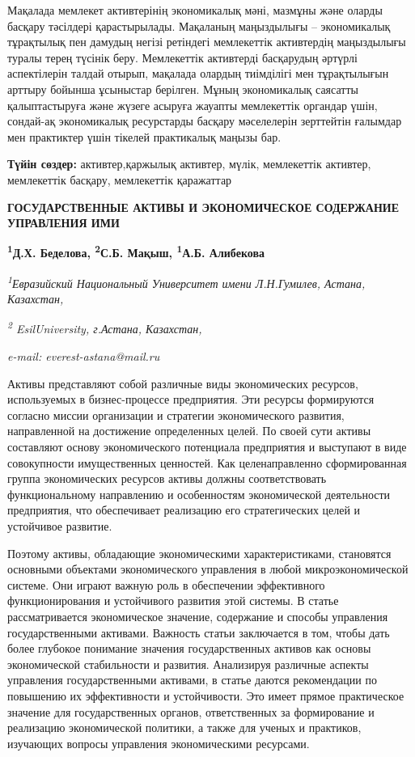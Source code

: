 Мақалада мемлекет активтерінің экономикалық мәні, мазмұны және оларды
басқару тәсілдері қарастырылады. Мақаланың маңыздылығы -- экономикалық
тұрақтылық пен дамудың негізі ретіндегі мемлекеттік активтердің
маңыздылығы туралы терең түсінік беру. Мемлекеттік активтерді басқарудың
әртүрлі аспектілерін талдай отырып, мақалада олардың тиімділігі мен
тұрақтылығын арттыру бойынша ұсыныстар берілген. Мұның экономикалық
саясатты қалыптастыруға және жүзеге асыруға жауапты мемлекеттік органдар
үшін, сондай-ақ экономикалық ресурстарды басқару мәселелерін зерттейтін
ғалымдар мен практиктер үшін тікелей практикалық маңызы бар.

{\bfseries Түйін сөздер:} активтер,қаржылық активтер, мүлік, мемлекеттік
активтер, мемлекеттік басқару, мемлекеттік қаражаттар

\begin{articleheader}
{\bfseries ГОСУДАРСТВЕННЫЕ АКТИВЫ И ЭКОНОМИЧЕСКОЕ СОДЕРЖАНИЕ УПРАВЛЕНИЯ ИМИ}

{\bfseries
\textsuperscript{1}Д.Х. Беделова\textsuperscript{\envelope },
\textsuperscript{2}С.Б. Мақыш,
\textsuperscript{1}А.Б. Алибекова}
\end{articleheader}

\begin{affiliation}
{\em \textsuperscript{1}Евразийский Национальный Университет имени Л.Н.Гумилев, Астана, Казахстан,}

{\em \textsuperscript{2} EsilUniversity, г.Астана, Казахстан,}

\emph{e-mail: everest-astana@mail.ru}
\end{affiliation}

Активы представляют собой различные виды экономических ресурсов,
используемых в бизнес-процессе предприятия. Эти ресурсы формируются
согласно миссии организации и стратегии экономического развития,
направленной на достижение определенных целей. По своей сути активы
составляют основу экономического потенциала предприятия и выступают в
виде совокупности имущественных ценностей. Как целенаправленно
сформированная группа экономических ресурсов активы должны
соответствовать функциональному направлению и особенностям экономической
деятельности предприятия, что обеспечивает реализацию его стратегических
целей и устойчивое развитие.

Поэтому активы, обладающие экономическими характеристиками, становятся
основными объектами экономического управления в любой микроэкономической
системе. Они играют важную роль в обеспечении эффективного
функционирования и устойчивого развития этой системы. В статье
рассматривается экономическое значение, содержание и способы управления
государственными активами. Важность статьи заключается в том, чтобы дать
более глубокое понимание значения государственных активов как основы
экономической стабильности и развития. Анализируя различные аспекты
управления государственными активами, в статье даются рекомендации по
повышению их эффективности и устойчивости. Это имеет прямое практическое
значение для государственных органов, ответственных за формирование и
реализацию экономической политики, а также для ученых и практиков,
изучающих вопросы управления экономическими ресурсами.

